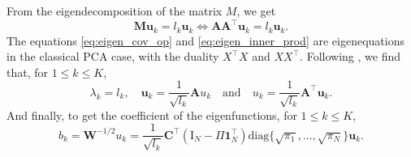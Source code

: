 From the eigendecomposition of the matrix $M$, we get
\begin{equation}\label{eq:eigen_inner_prod}
    \mathbf{M}\boldsymbol{u}_k = l_k \boldsymbol{u}_k \Longleftrightarrow \mathbf{A}\mathbf{A}^\top \boldsymbol{u}_k = l_k \boldsymbol{u}_k.
\end{equation}
The equations \eqref{eq:eigen_cov_op} and \eqref{eq:eigen_inner_prod} are eigenequations in the classical PCA case, with the duality $X^\top X$ and $XX^\top$. Following \cite{pagesMultipleFactorAnalysis2014,hardleAppliedMultivariateStatistical2019}, we find that, for $1 \leq k \leq K$,
\begin{equation}
    \lambda_k = l_k, \quad \boldsymbol{u}_k = \frac{1}{\sqrt{l_k}}\mathbf{A} u_k \quad\text{and}\quad u_k = \frac{1}{\sqrt{l_k}} \mathbf{A}^\top \boldsymbol{u}_k.
\end{equation}
And finally, to get the coefficient of the eigenfunctions, for $1 \leq k \leq K$,
\begin{equation}
    b_k = \mathbf{W}^{-1/2}u_k = \frac{1}{\sqrt{l_k}} \mathbf{C}^\top \left(\mathrm{I}_{\!N} - \Pi\mathbf{1}_{\!N}^\top\right) \text{diag}\{\sqrt{\pi_1}, \dots, \sqrt{\pi_N}\}\boldsymbol{u}_k.
\end{equation}


